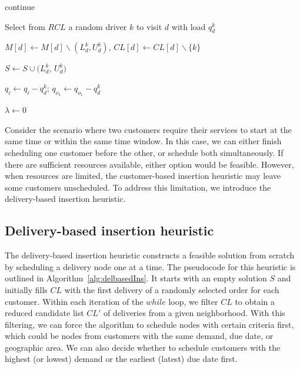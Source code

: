 \documentclass{article}
\begin{document}
{\begin{algorithm}[htpb]
{{{{                continue 

            }
            Select from $RCL$ a random driver $k$ to visit $d$ with load $q^k_d$

            $M[d]\leftarrow M[d] \backslash (L^k_{d}, U^k_{d})$, $CL[d]\leftarrow CL[d] \backslash \{k\} $

            $S \leftarrow S \cup (L^k_{d}$, $U^k_{d})  $

            $q_i \leftarrow q_i-q^k_{d}$;  $q_{o_1} \leftarrow q_{o_1}-q^k_{d}$

            $\lambda \leftarrow 0$

            }
            }
            }

        \end{algorithm}
    }

Consider the scenario where two customers require their services to start at the same time or within the same time window. In this case, we can either finish scheduling one customer before the other, or schedule both simultaneously.  If there are sufficient resources available, either option would be feasible. However, when resources are limited, the customer-based insertion heuristic may leave some customers unscheduled. To address this limitation, we introduce the delivery-based insertion heuristic.

\subsection{Delivery-based insertion heuristic}

The delivery-based insertion heuristic constructs a feasible solution from scratch by scheduling a delivery node one at a time. The pseudocode for this heuristic is outlined in Algorithm~\ref{alg:delbasedIns}. It starts with an empty solution $S$ and initially fills $CL$ with the first delivery of a randomly selected order for each customer. Within each iteration of the $while$ loop, we filter $CL$ to obtain a reduced candidate list $CL'$ of deliveries from a given neighborhood. With this filtering, we can force the algorithm to schedule nodes with certain criteria first, which could be nodes from customers with the same demand, due date, or geographic area. We can also decide whether to schedule customers with the highest (or lowest) demand or the earliest (latest) due date first.
\end{document}
